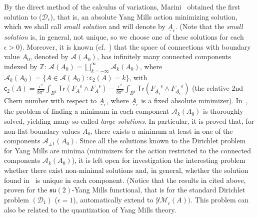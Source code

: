 \documentclass[11pt]{article}
\numberwithin{equation}{section} \setlength{\topmargin}{-35pt}
\newcommand{\Z}{\mathbb{Z}}
\newcommand{\YMe}{\mathcal{YM}_{\epsilon}}
\newcommand{\tr}{\mathsf{Tr}}
\begin{document}

\medskip
By the direct method of the calculus of variations,
Marini~\cite{Marini} obtained the first solution to
($\mathcal{D}_{\epsilon}$), that is, an absolute Yang Mills action
minimizing solution, which we shall call \emph{small solution} and
will denote by $\underline{A}_{\epsilon}$. (Note that the
\emph{small solution} is, in general,  not unique, so we choose one
of these solutions for each $\epsilon>0$). Moreover, it is known
(cf.~\cite{IM}) that the space of connections with boundary value
$A_0$, denoted by $\mathcal{A}(A_0)$, has infinitely many connected
components indexed by $\Z$:
$\mathcal{A}(A_0)=\bigsqcup_{k=-\infty}^{\infty}\mathcal{A}_k(A_0)$,
where
$\mathcal{A}_k(A_0)=\{A\in\mathcal{A}(A_0):\mathsf{c}_2(A)=k\}$,
with
$\mathsf{c}_2(A)=\frac{\epsilon^2}{8\pi^2}\int_{B^4}\tr({F_A}^{\epsilon}\wedge
{F_A}^{\epsilon})-\frac{\epsilon^2}{8\pi^2}\int_{B^4}\tr({F_{\underline{A}_{\epsilon}}}^{\epsilon}\wedge
{F_{\underline{A}_{\epsilon}}}^{\epsilon})$ (the relative 2nd Chern
number with respect to $\underline{A}_{\epsilon}$, where
$\underline{A}_\epsilon$ is a fixed absolute minimizer).
In~\cite{IM}, the problem of finding a minimum in each component
$\mathcal{A}_k(A_0)$ is thoroughly solved, yielding many so-called
\emph{large solutions}. In particular, it is proved that, for
non-flat boundary values $A_0$, there exists a minimum at least in
one of the components $\mathcal{A}_{\pm1}(A_0)$. Since all the
solutions known to the Dirichlet problem for Yang Mills are minima
(minimizers for the action restricted to the connected components
$\mathcal{A}_k(A_0)$), it is left open for investigation the
interesting problem whether there exist non-minimal solutions and,
in general, whether the solution found in~\cite{IM} is unique in
each component. (Notice that the results in \cite{Marini, IM} cited
above, proven for the $\mathfrak{su}(2)$-Yang Mills functional, that
is for the standard Dirichlet problem $(\mathcal{D}_1)$ ($\epsilon =
1$), automatically extend to $\YMe(A)).$
This problem can also be related to %
the quantization of Yang Mills theory.%
\end{document}
